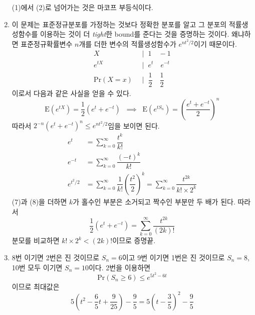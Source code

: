 \documentclass[answers]{exam}
\begin{document}
\begin{questions}
\begin{solution}
\begin{enumerate}
      (1)에서 (2)로 넘어가는 것은 마코프 부등식이다.
      \item 이 문제는 표준정규분포를 가정하는 것보다 정확한 분포를 알고 그 분포의 적률생성함수를 이용하는 것이 더 \emph{tight}한 bound를 준다는 것을 증명하는 것이다. 왜냐하면 표준정규확률변수 $n$개를 더한 변수의 적률생성함수가 $e^{nt^{2}/2}$이기 때문이다.
      \begin{align}
        X\;\;&|\;\; 1 \quad -1\\
        e^{tX}\;\;&|\;\;e^{t}\quad e^{-t}\\
        \mathrm{Pr}\left(X=x\right)\;\;&\Big|\;\; \dfrac{1}{2}\quad \dfrac{1}{2}
      \end{align}
      이로서 다음과 같은 사실을 얻을 수 있다.
      \begin{equation}
        \mathrm{E}\left(e^{tX}\right)= \dfrac{1}{2}\left(e^{t}+e^{-t}\right) \;\;\implies\;\; \mathrm{E}\left(e^{tS_{n}}\right)=\left(\dfrac{e^{t}+e^{-t}}{2}\right)^{n}
      \end{equation}
      따라서 $2^{-n}\left(e^{t}+e^{-t}\right)^{n}\leq e^{nt^{2}/2}$임을 보이면 된다.
      \begin{align}
        e^{t} &= \sum_{k=0}^{\infty}\dfrac{t^{k}}{k!}\\
        e^{-t} &= \sum_{k=0}^{\infty}\dfrac{\left(-t\right)^{k}}{k!}\\
        e^{t^{2}/2}&= \sum_{k=0}^{\infty}\dfrac{1}{k!}\left(\dfrac{t^{2}}{2}\right)^{k} = \sum_{k=0}^{\infty}\dfrac{t^{2k}}{k!\times 2^{k}}
      \end{align}
      (7)과 (8)을 더하면 $k$가 홀수인 부분은 소거되고 짝수인 부분만 두 배가 된다. 따라서
      \begin{equation}
        \dfrac{1}{2}\left(e^{t}+e^{-t}\right) = \sum_{k=0}^{\infty}\dfrac{t^{2k}}{\left(2k\right)!}
      \end{equation}
      분모를 비교하면 $k!\times 2^{k}<\left(2k\right)!$이므로 증명끝.
      \item 8번 이기면 2번은 진 것이므로 $S_{n}=6$이고 9번 이기면 1번은 진 것이므로 $S_{n}=8$, 10번 모두 이기면 $S_{n}=10$이다. 2번을 이용하면
      \begin{equation}
        \mathrm{Pr}\left(S_{n}\geq 6\right)\leq e^{5t^{2}-6t}
      \end{equation}
      이므로 최대값은
      \begin{equation}
        5\left(t^{2}-\dfrac{6}{5}t+\dfrac{9}{25}\right)-\dfrac{9}{5} = 5\left(t-\dfrac{3}{5}\right)^{2}-\dfrac{9}{5}
      \end{equation}

\end{enumerate}
\end{solution}
\end{questions}
\end{document}
